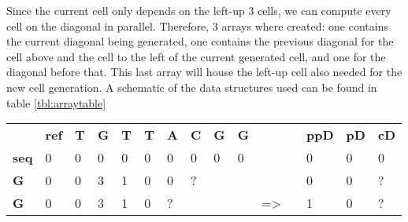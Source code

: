 Since the current cell only depends on the left-up 3 cells, we can compute every cell on the diagonal in parallel. Therefore, 3 arrays where created: one contains the current diagonal being generated, one contains the previous diagonal for the cell above and the cell to the left of the current generated cell, and one for the diagonal before that. This last array will house the left-up cell also needed for the new cell generation. A schematic of the data structures used can be found in table \ref{tbl:arraytable}

\begin{table}[H]
	\centering
	\begin{tabular}{|l|lllllllllll|l|l|l|}
		\cline{1-10} \cline{13-15}
		\multicolumn{1}{|c|}{\textbf{}} & \multicolumn{1}{r|}{\textbf{ref}} & \multicolumn{1}{l|}{\textbf{T}} & \multicolumn{1}{l|}{\textbf{G}} & \multicolumn{1}{l|}{\textbf{T}} & \multicolumn{1}{l|}{\textbf{T}} & \multicolumn{1}{l|}{\textbf{A}} & \multicolumn{1}{l|}{\textbf{C}} & \multicolumn{1}{l|}{\textbf{G}} & \multicolumn{1}{l|}{\textbf{G}} & \textbf{}       & \textbf{} & \textbf{ppD}              & \textbf{pD}               & \textbf{cD}               \\ \cline{1-10} \cline{13-15} 
		\textbf{seq}                    & 0                                 & 0                               & 0                               & 0                               & 0                               & \cellcolor[HTML]{9AFF99}0       & \cellcolor[HTML]{96FFFB}0       & \cellcolor[HTML]{FFCCC9}0       & 0                               &                 &           & \cellcolor[HTML]{9AFF99}0 & \cellcolor[HTML]{96FFFB}0 & \cellcolor[HTML]{FFCCC9}0 \\ \cline{1-1} \cline{13-15} 
		\textbf{G}                      & 0                                 & 0                               & 3                               & 1                               & \cellcolor[HTML]{9AFF99}0       & \cellcolor[HTML]{96FFFB}0       & \cellcolor[HTML]{FFCCC9}?       &                                 &                                 &                 &           & \cellcolor[HTML]{9AFF99}0 & \cellcolor[HTML]{96FFFB}0 & \cellcolor[HTML]{FFCCC9}? \\ \cline{1-1} \cline{13-15} 
		\textbf{G}                      & 0                                 & 0                               & 3                               & \cellcolor[HTML]{9AFF99}1       & \cellcolor[HTML]{96FFFB}0       & \cellcolor[HTML]{FFCCC9}?       &                                 &                                 &                                 & =\textgreater{} &           & \cellcolor[HTML]{9AFF99}1 & \cellcolor[HTML]{96FFFB}0 & \cellcolor[HTML]{FFCCC9}? \\ \cline{1-1} \cline{13-15} 

\end{tabular}
\end{table}
